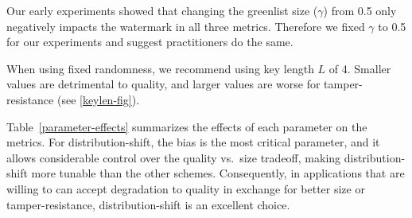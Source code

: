 

\smallskip{}
Our early experiments showed that changing the greenlist size ($\gamma$) from 
0.5 only negatively impacts the watermark in all three metrics.
Therefore we fixed $\gamma$ to 0.5 for our experiments and suggest practitioners do the same. 

\smallskip{} 
When using fixed randomness, we recommend using key length $L$ of 4.
Smaller values are detrimental to quality, and larger values are worse
for tamper-resistance (see \cref{keylen-fig}).





\smallskip{}
Table~\ref{parameter-effects} summarizes the effects of each parameter on the metrics.
For distribution-shift, the bias is the most critical parameter, and it allows considerable 
control over the quality vs.\ size tradeoff, making distribution-shift more tunable than the other schemes.
Consequently, in applications that are willing to can accept degradation to quality in exchange for 
better size or tamper-resistance, distribution-shift is an excellent choice.

